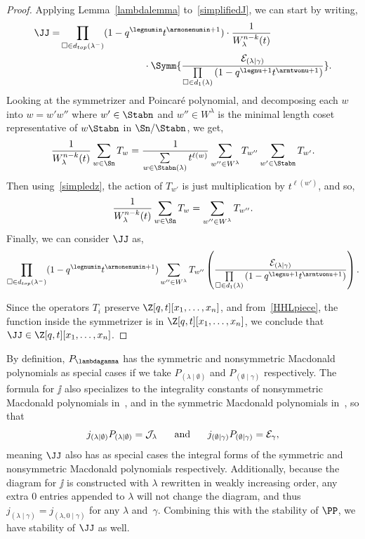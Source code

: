 \begin{proof} 
Applying Lemma~\ref{lambdalemma} to~\eqref{simplifiedJ}, we can start by writing,
\begin{align*}  \JJ =  &\prod\limits_{\square \in d_{top}(\lambda^-)} (1-q^{\legnumin} t^{\armonenumin + 1}) \cdot \frac{1}{W^{n-k}_\lambda(t)} \\ & \hspace*{3cm}\cdot \Symm{\frac{\mathcal{E}_{(\lambda \mid \gamma)}}{\prod\limits_{\square \in d_1(\lambda)} \left(1-q^{\legnu+1}t^{\armtwonu +1} \right)}} . \end{align*}
 Looking at the symmetrizer and Poincar\'e polynomial, and decomposing each $w$ into $w=w'w''$ where $w'\in \Stabn$ and $w'' \in W^{\lambda}$ is the minimal length coset representative of $w\Stabn$ in $\Sn / \Stabn$, we get,
\[ \frac{1}{W^{n-k}_\lambda(t)} \sum\limits_{w\in \Sn} T_w = \frac{1}{\sum\limits_{w\in \Stabn(\lambda)} t^{\ell(w)}} \sum\limits_{w''\in W^\lambda}T_{w''} \sum\limits_{w'\in \Stabn}T_{w'}. \]
Then using~\eqref{simpledz}, the action of $T_{w'}$ is just multiplication by $t^{\ell(w')}$, and so,
\[ \frac{1}{W^{n-k}_\lambda(t)} \sum\limits_{w\in \Sn} T_w = \sum\limits_{w''\in W^\lambda}T_{w''}. \]
Finally, we can consider $\JJ$ as,
\[ \prod\limits_{\square \in d_{top}(\lambda^-)} (1-q^{\legnumin} t^{\armonenumin + 1})  \sum\limits_{w''\in W^\lambda}T_{w''}  \left(\frac{\mathcal{E}_{(\lambda \mid \gamma)}}{\prod\limits_{\square \in d_1(\lambda)} \left(1-q^{\legnu+1}t^{\armtwonu +1} \right)} \right).\]

Since the operators $T_i$ preserve $\Z[q,t][x_1,\dotsc,x_n]$, and from~\eqref{HHLpiece}, the function inside the symmetrizer is in $\Z[q,t][x_1,\dotsc,x_n]$, we conclude that $\JJ \in \Z[q,t][x_1,\dotsc,x_n]$.
\end{proof}

 By definition, $P_{\lambdagamma}$ has the symmetric and nonsymmetric Macdonald polynomials as special cases if we take $P_{(\lambda \mid \emptyset)}$ and $P_{(\emptyset \mid \gamma)}$ respectively. The formula for $\jj$ also specializes to the integrality constants of nonsymmetric Macdonald polynomials in~\cite{MR3443860}, and in the symmetric Macdonald polynomials in~\cite[section VI.8]{MR1427661}, so that
\[ j_{(\lambda \mid \emptyset)} P_{(\lambda \mid \emptyset)} = \mathcal{J}_\lambda \hspace{.5cm} \text{ and } \hspace{.5cm}  j_{(\emptyset \mid \gamma)} P_{(\emptyset \mid \gamma)} = \mathcal{E}_\gamma,\]
meaning $\JJ$ also has as special cases the integral forms of the symmetric and nonsymmetric Macdonald polynomials respectively. Additionally, because the diagram for $\jj$ is constructed with $\lambda$ rewritten in weakly increasing order, any extra 0 entries appended to $\lambda$ will not change the diagram, and thus $j_{(\lambda \mid \gamma)} = j_{(\lambda, 0 \mid \gamma)}$ for any $\lambda$ and~$\gamma$. Combining this with the stability of $\PP$, we have stability of $\JJ$ as well.

